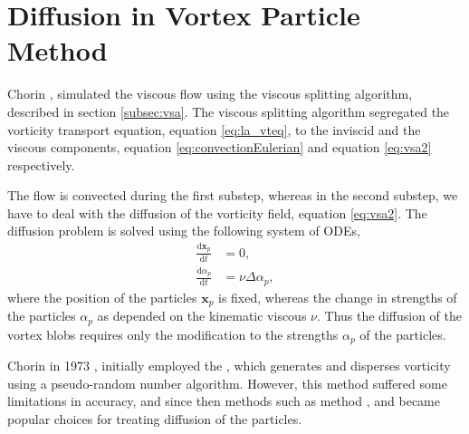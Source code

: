%
%
%	

\section{Diffusion in Vortex Particle Method}
\label{sec:diffusionVM}

Chorin \cite{Chorin1973a}, simulated the viscous flow using the viscous splitting algorithm, described in section \ref{subsec:vsa}. The viscous splitting algorithm segregated the vorticity transport equation, equation \ref{eq:la_vteq}, to the inviscid and the viscous components, equation \ref{eq:convectionEulerian} and equation \ref{eq:vsa2} respectively. 

The flow is convected during the first substep, whereas in the second substep, we have to deal with the diffusion of the vorticity field, equation \ref{eq:vsa2}. The diffusion problem is solved using the following system of ODEs, 
	\begin{subequations}
	\begin{align}
	\frac{\mathrm{d}\mathbf{x}_p}{\mathrm{d}t} &= 0,\\
	\frac{\mathrm{d}\alpha_p}{\mathrm{d}t} &= \nu\Delta\alpha_p,
	\end{align}
	\label{eq:la_sysODEsDiff}
	\end{subequations}
where the position of the particles $\mathbf{x}_p$ is fixed, whereas the change in strengths of the particles $\alpha_p$ as depended on the kinematic viscous $\nu$. Thus the diffusion of the vortex blobs requires only the modification to the strengths $\alpha_p$ of the particles. 

Chorin in 1973 \cite{Chorin1973a}, initially employed the , which generates and disperses vorticity using a pseudo-random number algorithm. However, this method suffered some limitations in accuracy, and since then methods such as  method \cite{Degond1989a}, and  \cite{Shankar1996} became popular choices for treating diffusion of the particles.

